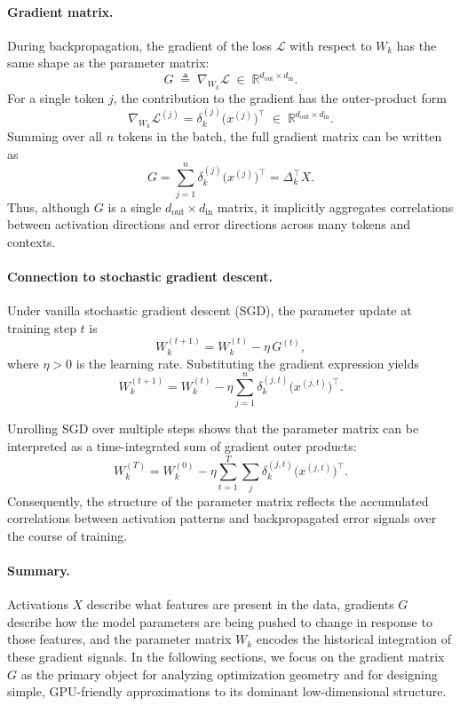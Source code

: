 \paragraph{Gradient matrix.}
During backpropagation, the gradient of the loss $\mathcal{L}$ with respect to $W_k$
has the same shape as the parameter matrix:
\[
G \;\triangleq\; \nabla_{W_k} \mathcal{L}
\;\in\;
\mathbb{R}^{d_{\text{out}} \times d_{\text{in}}}.
\]
For a single token $j$, the contribution to the gradient has the outer-product form
\[
\nabla_{W_k} \mathcal{L}^{(j)}
=
\delta_k^{(j)} \bigl(x^{(j)}\bigr)^\top
\;\in\;
\mathbb{R}^{d_{\text{out}} \times d_{\text{in}}}.
\]
Summing over all $n$ tokens in the batch, the full gradient matrix can be written as
\[
G
=
\sum_{j=1}^{n}
\delta_k^{(j)} \bigl(x^{(j)}\bigr)^\top
=
\Delta_k^\top X.
\]
Thus, although $G$ is a single $d_{\text{out}} \times d_{\text{in}}$ matrix, it
implicitly aggregates correlations between activation directions and error
directions across many tokens and contexts.

\paragraph{Connection to stochastic gradient descent.}
Under vanilla stochastic gradient descent (SGD), the parameter update at training
step $t$ is
\[
W_k^{(t+1)}
=
W_k^{(t)} - \eta \, G^{(t)},
\]
where $\eta > 0$ is the learning rate.
Substituting the gradient expression yields
\[
W_k^{(t+1)}
=
W_k^{(t)}
-
\eta
\sum_{j=1}^{n}
\delta_k^{(j,t)} \bigl(x^{(j,t)}\bigr)^\top.
\]

Unrolling SGD over multiple steps shows that the parameter matrix can be interpreted
as a time-integrated sum of gradient outer products:
\[
W_k^{(T)}
=
W_k^{(0)}
-
\eta
\sum_{t=1}^{T}
\sum_{j}
\delta_k^{(j,t)} \bigl(x^{(j,t)}\bigr)^\top.
\]
Consequently, the structure of the parameter matrix reflects the accumulated
correlations between activation patterns and backpropagated error signals over the
course of training.

\paragraph{Summary.}
Activations $X$ describe what features are present in the data, gradients $G$ describe
how the model parameters are being pushed to change in response to those features,
and the parameter matrix $W_k$ encodes the historical integration of these gradient
signals.
In the following sections, we focus on the gradient matrix $G$ as the primary object
for analyzing optimization geometry and for designing simple, GPU-friendly
approximations to its dominant low-dimensional structure.
